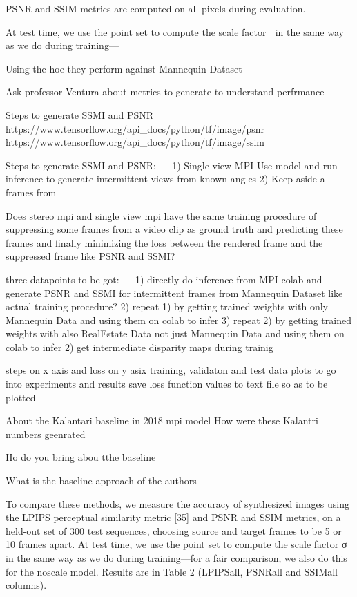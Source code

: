 PSNR and SSIM metrics are computed on all pixels during evaluation.

At test time, we use the point
set to compute the scale factor  in the same way as we do
during training—

Using the 
hoe they perform against Mannequin Dataset 

Ask professor Ventura about metrics to generate to understand perfrmance 

Steps to generate SSMI and PSNR
\cite{wang_ssmi_psnr}
https://www.tensorflow.org/api_docs/python/tf/image/psnr
https://www.tensorflow.org/api_docs/python/tf/image/ssim

Steps to generate SSMI and PSNR: ---
1) Single view MPI Use model and run inference to generate intermittent views from known angles 
2) Keep aside a frames from 

Does stereo mpi and single view mpi have the same training procedure of suppressing some frames from a video clip as ground truth and predicting these frames and finally minimizing the loss between the rendered frame and the suppressed frame like PSNR and SSMI?

three datapoints to be got: ---
1) directly do inference from MPI colab and generate PSNR and SSMI for intermittent frames from Mannequin Dataset like actual training procedure?
2) repeat 1) by getting trained weights with only Mannequin Data and using them on colab to infer  
3) repeat 2) by getting trained weights with also RealEstate Data not just Mannequin Data and using them on colab to infer
2) get intermediate disparity maps during trainig 

steps on x axis and loss on y asix
training, validaton and test data plots to go into experiments and results
save loss function values to text file so as to be plotted

About the Kalantari baseline in 2018 mpi model
How were these Kalantri numbers geenrated

Ho do you bring abou tthe baseline 

What is the baseline approach of the authors 

To compare these methods, we measure the accuracy of
synthesized images using the LPIPS perceptual similarity
metric [35] and PSNR and SSIM metrics, on a held-out set
of 300 test sequences, choosing source and target frames
to be 5 or 10 frames apart. At test time, we use the point
set to compute the scale factor σ in the same way as we do
during training—for a fair comparison, we also do this for
the noscale model. Results are in Table 2 (LPIPSall, PSNRall
and SSIMall columns).

